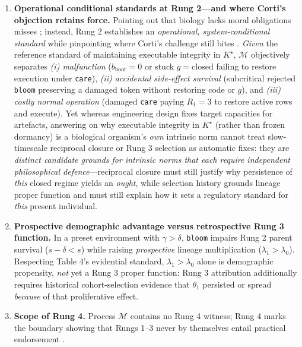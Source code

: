 \documentclass[12pt,letterpaper]{article}
\providecommand{\tightlist}{\setlength{\itemsep}{2pt}\setlength{\parskip}{0pt}}
\begin{document}
\begin{enumerate}
\def\labelenumi{\arabic{enumi}.}
\tightlist
\item
  \textbf{Operational conditional standards at Rung 2---and where
  Corti's objection retains force.} Pointing out that biology lacks
  moral obligations misses \citet{corti2023}; instead, Rung 2
  establishes an \emph{operational, system-conditional standard}
  \citep{nagel1977, walsh2015} while pinpointing where Corti's challenge
  still bites \citep{bedau1992, cuciniello2026}. \emph{Given} the
  reference standard of maintaining executable integrity in \(K^\star\),
  \(\mathcal{M}\) objectively separates \emph{(i) malfunction}
  (\(b_{\mathrm{boot}}=0\) or stuck \(g=\mathrm{closed}\) failing to
  restore execution under \texttt{care}), \emph{(ii) accidental
  side-effect survival} (subcritical rejected \texttt{bloom} preserving
  a damaged token without restoring code or \(g\)), and \emph{(iii)
  costly normal operation} (damaged \texttt{care} paying \(R_1=3\) to
  restore active rows and execute). Yet whereas engineering design fixes
  target capacities for artefacts, answering \citet{corti2023} on why
  executable integrity in \(K^\star\) (rather than frozen dormancy) is a
  biological organism's \emph{own} intrinsic norm cannot treat
  slow-timescale reciprocal closure \citep{montevilMossio2015} or Rung 3
  selection \citep{millikan1984, garson2019} as automatic fixes: they
  are \emph{distinct candidate grounds for intrinsic norms that each
  require independent philosophical defence}---reciprocal closure must
  still justify why persistence of \emph{this} closed regime yields an
  \emph{ought}, while selection history grounds lineage proper function
  and must still explain how it sets a regulatory standard for
  \emph{this} present individual.
\item
  \textbf{Prospective demographic advantage versus retrospective Rung 3
  function.} In a preset environment with \(\gamma > \delta\),
  \texttt{bloom} impairs Rung 2 parent survival (\(s-\delta < s\)) while
  raising \emph{prospective} lineage multiplication
  (\(\lambda_1 > \lambda_0\)). Respecting Table 4's evidential standard,
  \(\lambda_1 > \lambda_0\) alone is demographic propensity, \emph{not}
  yet a Rung 3 proper function: Rung 3 attribution additionally requires
  historical cohort-selection evidence that \(\theta_1\) persisted or
  spread \emph{because} of that proliferative effect.
\item
  \textbf{Scope of Rung 4.} Process \(\mathcal{M}\) contains no Rung 4
  witness; Rung 4 marks the boundary showing that Rungs 1--3 never by
  themselves entail practical endorsement
  \citep{korsgaard1996, street2006, list2019}.
\end{enumerate}
\end{document}

